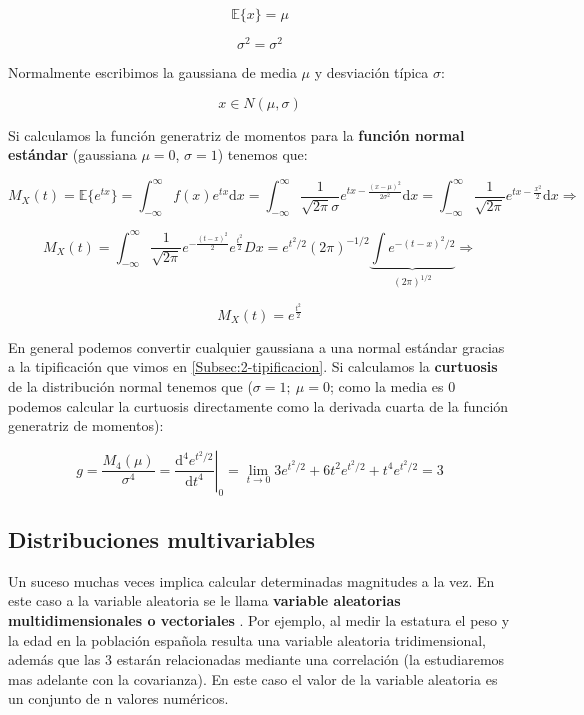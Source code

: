 \documentclass[12pt,a4paper]{book}
\newcommand{\D}{\mathrm{d}}
\newcommand{\EE}[1]{ \mathbb{E} \{ #1 \}  }
\newcommand{\integral}{\int_{-\infty}^{\infty}}
\begin{document}
\begin{equation}
\EE{x} = \mu 
\end{equation}

\begin{equation}
\sigma^2 = \sigma^2
\end{equation}

Normalmente escribimos la gaussiana de media $\mu$ y desviación típica $\sigma$:

$$ x \in N(\mu, \sigma) $$

Si calculamos la función generatriz de momentos para la \textbf{función normal estándar} (gaussiana $\mu=0$, $\sigma=1$) tenemos que: 

$$ M_X(t) = \EE{e^{tx}} = \integral  f(x) e^{ tx} \D x = \integral \frac{1}{\sqrt{2 \pi} \sigma} e^{tx - \frac{(x - \mu)^2}{2 \sigma^2}} \D x =  \integral \frac{1}{\sqrt{2 \pi}} e^{tx - \frac{x^2}{2}} \D x \Longrightarrow $$

$$ M_X (t) = \integral \frac{1}{\sqrt{2 \pi}} e^{-\frac{(t-x)^2}{2}} e^{\frac{t^2}{2}}D x  = e^{t^2 /2} (2\pi)^{-1/2} \underbrace{\int e^{-(t-x)^2 /2}}_{(2\pi)^{1/2}} \Longrightarrow$$

\begin{equation}
M_X(t) = e^{\frac{t^2}{2}}
\end{equation}

En general podemos convertir cualquier gaussiana a una normal estándar  gracias a la tipificación que vimos en \ref{Subsec:2-tipificacion}. Si calculamos la \textbf{curtuosis} de la distribución normal tenemos que ($\sigma = 1; \ \mu=0$; como la media es 0 podemos calcular la curtuosis directamente como la derivada cuarta de la función generatriz de momentos):

$$  g = \frac{M_4(\mu)}{\sigma^4} = \left. \frac{\D^4 e^{t^2/2}}{\D t^4} \right| _0 = \lim_{t \rightarrow 0} 3 e^{t^2/2} + 6t^2 e^{t^2/2} + t^4 e^{t^2/2} = 3 $$

\subsection{Distribuciones multivariables}

Un suceso muchas veces implica calcular determinadas magnitudes a la vez. En este caso a la variable aleatoria se le llama \textbf{variable aleatorias multidimensionales o vectoriales} . Por ejemplo, al medir la estatura el peso y la edad en la población española resulta una variable aleatoria tridimensional, además que las 3 estarán relacionadas mediante una correlación (la estudiaremos mas adelante con la covarianza). En este caso el valor de la variable aleatoria es un conjunto de n valores numéricos. \\
\end{document}
